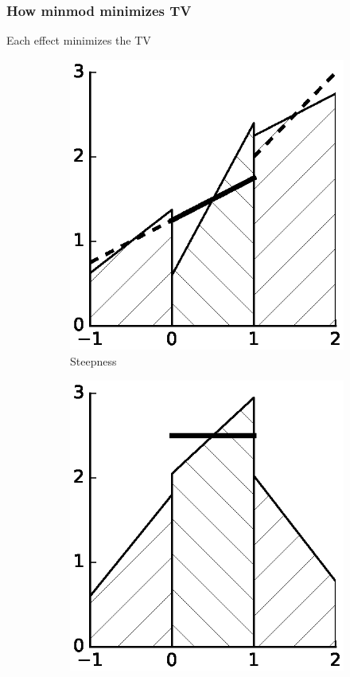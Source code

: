 \documentclass[11pt]{beamer}
\begin{document}
\begin{frame}
  \frametitle{How minmod minimizes TV}
  Each effect minimizes the TV
  \begin{figure}[h]
    \centering
    \begin{subfigure}{0.3\textwidth}
      \centering
      \includegraphics[width=\textwidth]{figures/minmod/steepness}
      \caption{Steepness}
    \end{subfigure}
    \hfill
    \begin{subfigure}{0.3\textwidth}
      \centering
      \includegraphics[width=\textwidth]{figures/minmod/extremum}

\end{subfigure}
\end{figure}
\end{frame}
\end{document}
